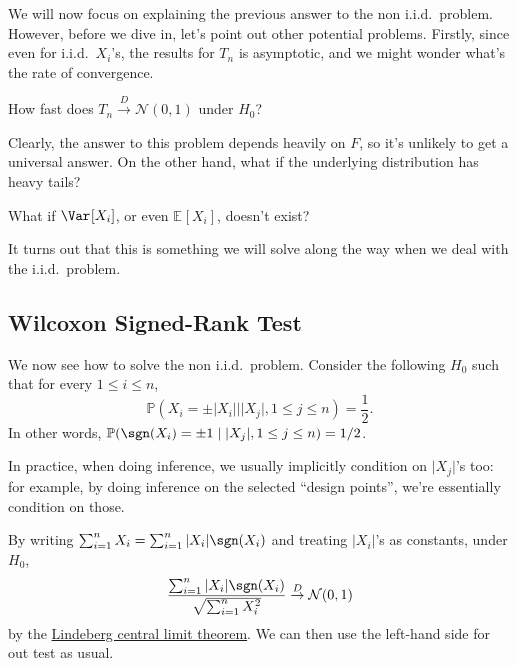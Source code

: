 We will now focus on explaining the previous answer to the non i.i.d.\ problem. However, before we dive in, let's point out other potential problems. Firstly, since even for i.i.d.\ \(X_i\)'s, the results for \(T_n\) is asymptotic, and we might wonder what's the rate of convergence.

\begin{problem*}
	How fast does \(T_n \overset{D}{\to} \mathcal{N} (0, 1)\) under \(H_0\)?
\end{problem*}

Clearly, the answer to this problem depends heavily on \(F\), so it's unlikely to get a universal answer. On the other hand, what if the underlying distribution has heavy tails?

\begin{problem*}
	What if \(\Var_{}[X_i] \), or even \(\mathbb{E}_{}[X_i] \), doesn't exist?
\end{problem*}

It turns out that this is something we will solve along the way when we deal with the i.i.d.\ problem.

\subsection{Wilcoxon Signed-Rank Test}
We now see how to solve the non i.i.d.\ problem. Consider the following \(H_0\) such that for every \(1 \leq i \leq n\),
\[
	\mathbb{P} (X_i = \pm \vert X_i \vert \mid \vert X_j \vert , 1 \leq j \leq n) = \frac{1}{2}.
\]
In other words, \(\mathbb{P} (\sgn (X_i) = \pm 1 \mid \vert X_j \vert , 1 \leq j \leq n) = 1 / 2\).

\begin{intuition}
	In practice, when doing inference, we usually implicitly condition on \(\vert X_j \vert \)'s too: for example, by doing inference on the selected ``design points'', we're essentially condition on those.
\end{intuition}

By writing \(\sum_{i=1}^{n} X_i = \sum_{i=1}^{n} \vert X_i \vert \sgn (X_i)\) and treating \(\vert X_i \vert \)'s as constants, under \(H_0\),
\[
	\frac{\sum_{i=1}^{n} \vert X_i \vert \sgn (X_i)}{\sqrt{\sum_{i=1}^{n} X_i^2} }
	\overset{D}{\to} \mathcal{N} (0, 1)
\]
by the \hyperref[thm:Lindeberg-CLT]{Lindeberg central limit theorem}. We can then use the left-hand side for out test as usual.

